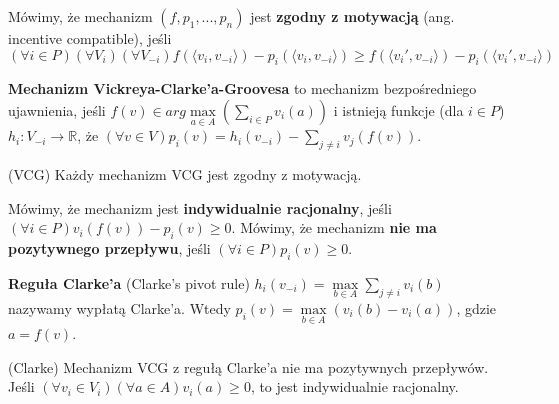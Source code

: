\begin{definicja}
    Mówimy, że mechanizm $(f, p_1, ..., p_n)$ jest \textbf{zgodny z motywacją} (ang. incentive compatible), jeśli
    $(\forall i \in P)(\forall V_i)(\forall V_{-i})f(\langle v_i, v_{-i} \rangle) - p_i(\langle v_i, v_{-i} \rangle) \geq f(\langle v_i', v_{-i} \rangle) - p_i(\langle v_i', v_{-i} \rangle)$
\end{definicja}

\begin{definicja}
    \textbf{Mechanizm Vickreya-Clarke'a-Groovesa} to mechanizm bezpośredniego ujawnienia, jeśli $f(v) \in arg\max\limits_{a \in A}(\sum\limits_{i \in P}v_i(a))$
    i istnieją funkcje (dla $i \in P$) $h_i : V_{-i} \rightarrow \mathbb{R}$, że $(\forall v \in V) p_i(v) = h_i(v_{-i}) - \sum\limits_{j \neq i}v_j(f(v))$.
\end{definicja}

\begin{twierdzenie}{(VCG)}
    Każdy mechanizm VCG jest zgodny z motywacją.
\end{twierdzenie}

\begin{definicja}
    Mówimy, że mechanizm jest \textbf{indywidualnie racjonalny}, jeśli $(\forall i \in P) v_i(f(v)) - p_i(v) \geq 0$.
    Mówimy, że mechanizm \textbf{nie ma pozytywnego przepływu}, jeśli $(\forall i \in P)p_i(v) \geq 0$.
\end{definicja}

\begin{definicja}{\textbf{Reguła Clarke'a} (Clarke's pivot rule)}
    $h_i(v_{-i}) = \max\limits_{b \in A}\sum\limits_{j \neq i}v_i(b)$ nazywamy wypłatą Clarke'a.
    Wtedy $p_i(v) = \max\limits_{b \in A}(v_i(b) - v_i(a))$, gdzie $a = f(v)$.
\end{definicja}

\begin{twierdzenie}{(Clarke)}
    Mechanizm VCG z regułą Clarke'a nie ma pozytywnych przepływów. Jeśli $(\forall v_i \in V_i)(\forall a \in A)v_i(a) \geq 0$, to jest indywidualnie racjonalny.
\end{twierdzenie}